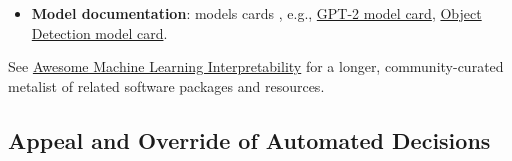 \documentclass[information,article,accept,moreauthors,pdftex]{Definitions/mdpi}
\begin{document}
\begin{itemize}[leftmargin=*,labelsep=5.8mm]
\item \textbf{Model documentation}: models cards \cite{model_cards}, e.g.,  
\href{https://github.com/openai/gpt-2/blob/master/model_card.md}{GPT-2 model card}, 
\href{https://modelcards.withgoogle.com/object-detection}{Object Detection model card}. 

\end{itemize}


See 
\href{https://github.com/jphall663/awesome-machine-learning-interpretability}
{Awesome Machine Learning Interpretability} for a longer, community-curated metalist of related software packages and resources. 

\subsection{Appeal and Override of Automated Decisions}
\end{document}
